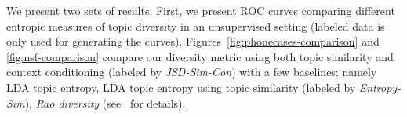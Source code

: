 We present two sets of results. First, we present
ROC curves comparing different entropic measures of topic diversity in an unsupervised setting 
(labeled data is only used for generating the curves). Figures~\ref{fig:phonecases-comparison} and \ref{fig:nsf-comparison}
compare our diversity metric using both topic similarity and context
conditioning (labeled by {\em JSD-Sim-Con}) with a few baselines;
namely LDA topic entropy, LDA topic entropy using topic similarity
(labeled by {\em Entropy-Sim}), {\em Rao diversity}
(see~\cite{bache:2013} for details). 



